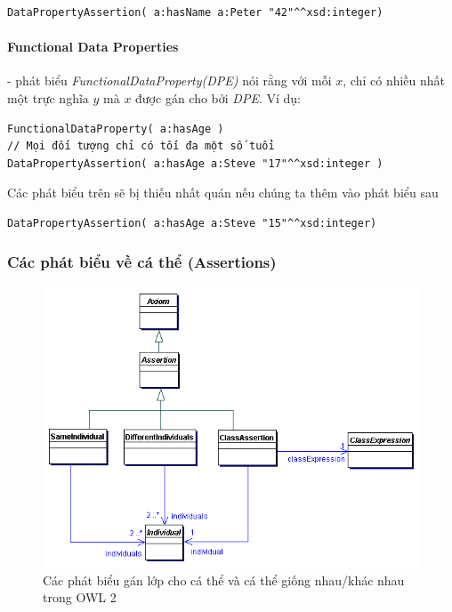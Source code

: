 \begin{verbatim}
DataPropertyAssertion( a:hasName a:Peter "42"^^xsd:integer)
\end{verbatim}

\paragraph{Functional Data Properties} - phát biểu \textit{FunctionalDataProperty(DPE)} nói rằng với mỗi $x$, chỉ có nhiều nhất một trực nghĩa $y$ mà $x$ được gán cho bởi \textit{DPE}. Ví dụ:
\begin{verbatim}
FunctionalDataProperty( a:hasAge )
// Mọi đối tượng chỉ có tối đa một số tuổi
DataPropertyAssertion( a:hasAge a:Steve "17"^^xsd:integer )
\end{verbatim}
Các phát biểu trên sẽ bị thiếu nhất quán nếu chúng ta thêm vào phát biểu sau 
\begin{verbatim}
DataPropertyAssertion( a:hasAge a:Steve "15"^^xsd:integer)
\end{verbatim}

\subsubsection{Các phát biểu về cá thể (Assertions)} 
\begin{figure}[H]
	\centering
	\includegraphics[width=120mm]{Figures/abox1.png}
	\caption{Các phát biểu gán lớp cho cá thể và cá thể giống nhau/khác nhau trong OWL 2 \label{overflow}}
\end{figure}

